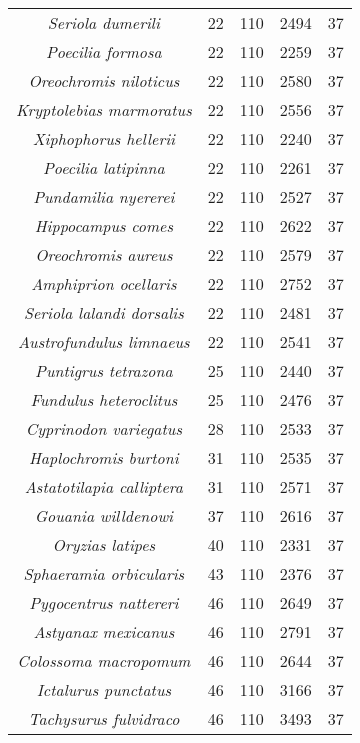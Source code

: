 \begin{longtable}[c]{|c|c|c|c|c|}
\textit{Seriola dumerili}              & 22  & 110 & 2494 & 37 \\
\textit{Poecilia formosa}              & 22  & 110 & 2259 & 37 \\
\textit{Oreochromis niloticus}         & 22  & 110 & 2580 & 37 \\
\textit{Kryptolebias marmoratus}       & 22  & 110 & 2556 & 37 \\
\textit{Xiphophorus hellerii}          & 22  & 110 & 2240 & 37 \\
\textit{Poecilia latipinna}            & 22  & 110 & 2261 & 37 \\
\textit{Pundamilia nyererei}           & 22  & 110 & 2527 & 37 \\
\textit{Hippocampus comes}             & 22  & 110 & 2622 & 37 \\
\textit{Oreochromis aureus}            & 22  & 110 & 2579 & 37 \\
\textit{Amphiprion ocellaris}          & 22  & 110 & 2752 & 37 \\
\textit{Seriola lalandi dorsalis}      & 22  & 110 & 2481 & 37 \\
\textit{Austrofundulus limnaeus}       & 22  & 110 & 2541 & 37 \\
\textit{Puntigrus tetrazona}           & 25  & 110 & 2440 & 37 \\
\textit{Fundulus heteroclitus}         & 25  & 110 & 2476 & 37 \\
\textit{Cyprinodon variegatus}         & 28  & 110 & 2533 & 37 \\
\textit{Haplochromis burtoni}          & 31  & 110 & 2535 & 37 \\
\textit{Astatotilapia calliptera}      & 31  & 110 & 2571 & 37 \\
\textit{Gouania willdenowi}            & 37  & 110 & 2616 & 37 \\
\textit{Oryzias latipes}               & 40  & 110 & 2331 & 37 \\
\textit{Sphaeramia orbicularis}        & 43  & 110 & 2376 & 37 \\
\textit{Pygocentrus nattereri}         & 46  & 110 & 2649 & 37 \\
\textit{Astyanax mexicanus}            & 46  & 110 & 2791 & 37 \\
\textit{Colossoma macropomum}          & 46  & 110 & 2644 & 37 \\
\textit{Ictalurus punctatus}           & 46  & 110 & 3166 & 37 \\
\textit{Tachysurus fulvidraco}         & 46  & 110 & 3493 & 37 \\

\end{longtable}
